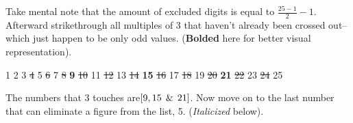 \documentclass[12pt, letterpaper, twosided]{report}
\begin{document}
Take mental note that the amount of excluded digits is equal to $\frac{25-1}{2}-1$. Afterward strikethrough all multiples of 3 that haven't already been crossed out--which just happen to be only odd values. (\textbf{Bolded} here for better visual representation).
\begin{center}
1 \hspace{0.5cm}2 \hspace{0.5cm}3 \hspace{0.5cm}\sout{4} \hspace{0.5cm}5 \hspace{0.5cm}\sout{6} \hspace{0.5cm}7 \hspace{0.5cm}\sout{8} \hspace{0.5cm}\textbf{9} \hspace{0.5cm}\sout{10} \hspace{0.5cm}11 \hspace{0.5cm}\sout{12} \hspace{0.5cm}13 \hspace{0.5cm}\sout{14} \hspace{0.5cm}\textbf{15} \hspace{0.5cm}\sout{16} \hspace{0.5cm}17 \hspace{0.5cm}\sout{18} \hspace{0.5cm}19 \hspace{0.5cm}\sout{20} \hspace{0.5cm}\textbf{21} \hspace{0.5cm}\sout{22} \hspace{0.5cm}23 \hspace{0.5cm}\sout{24} \hspace{0.5cm}25
\end{center}
The numbers that 3 touches are$[9, 15 \hspace{0.15cm}\&\hspace{0.15cm} 21]$. Now move on to the last number that can eliminate a figure from the list, 5. (\textit{Italicized} below).
\end{document}
